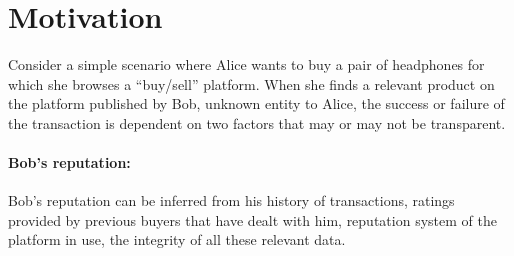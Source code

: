  
\section{Motivation}
Consider a simple scenario where Alice wants to buy a pair of headphones for
which she browses a ``buy/sell'' platform. When she finds a relevant product on the
platform published by Bob, unknown entity to Alice, the success or failure of
the transaction is dependent on two factors that may or may not be transparent.
\paragraph{Bob's reputation:} Bob's reputation can be inferred from his history
of transactions, ratings provided by previous buyers that have dealt with him,
reputation system of the platform in use, the integrity of all these relevant
data.  
